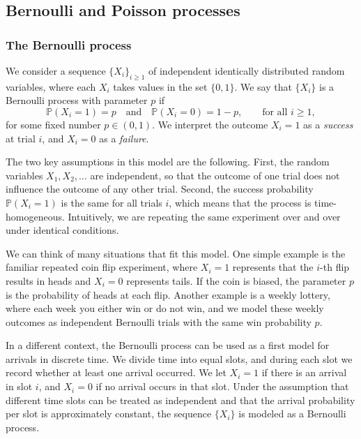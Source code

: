 
\subsection{Bernoulli and Poisson processes}

\subsubsection{The Bernoulli process}

We consider a sequence \(\{X_i\}_{i \geq 1}\) of independent identically distributed random variables, where each \(X_i\) takes values in the set \(\{0,1\}\).  
We say that \(\{X_i\}\) is a Bernoulli process with parameter \(p\) if
\[
\mathbb{P}(X_i = 1) = p
\quad\text{and}\quad
\mathbb{P}(X_i = 0) = 1 - p,
\qquad\text{for all } i \geq 1,
\]
for some fixed number \(p \in (0,1)\).  
We interpret the outcome \(X_i = 1\) as a \textit{success} at trial \(i\), and \(X_i = 0\) as a \textit{failure}.  

The two key assumptions in this model are the following.  
First, the random variables \(X_1, X_2, \ldots\) are independent, so that the outcome of one trial does not influence the outcome of any other trial.  
Second, the success probability \(\mathbb{P}(X_i = 1)\) is the same for all trials \(i\), which means that the process is time-homogeneous.  
Intuitively, we are repeating the same experiment over and over under identical conditions.  

We can think of many situations that fit this model.  
One simple example is the familiar repeated coin flip experiment, where \(X_i = 1\) represents that the \(i\)-th flip results in heads and \(X_i = 0\) represents tails.  
If the coin is biased, the parameter \(p\) is the probability of heads at each flip.  
Another example is a weekly lottery, where each week you either win or do not win, and we model these weekly outcomes as independent Bernoulli trials with the same win probability \(p\).  

In a different context, the Bernoulli process can be used as a first model for arrivals in discrete time.  
We divide time into equal slots, and during each slot we record whether at least one arrival occurred.  
We let \(X_i = 1\) if there is an arrival in slot \(i\), and \(X_i = 0\) if no arrival occurs in that slot.  
Under the assumption that different time slots can be treated as independent and that the arrival probability per slot is approximately constant, the sequence \(\{X_i\}\) is modeled as a Bernoulli process.  

